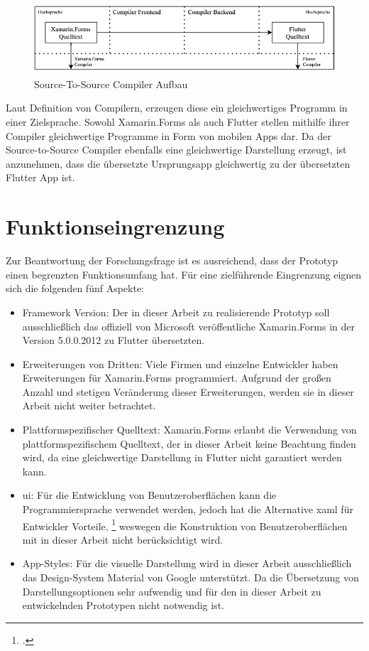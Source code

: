 \begin{figure}[!ht]
 \includegraphics[width=14.5cm]{Images/CompilerArchitecture/S2SArchitecture.png}
 \caption{Source-To-Source Compiler Aufbau}
 \label{fig:S2SCompilerAufbau}
\end{figure}

Laut Definition von Compilern, erzeugen diese ein gleichwertiges Programm in einer Zielsprache.  Sowohl Xamarin.Forms als auch Flutter stellen mithilfe ihrer Compiler gleichwertige Programme in Form von mobilen Apps dar.  Da der Source-to-Source Compiler ebenfalls eine gleichwertige Darstellung erzeugt, ist anzunehmen, dass die übersetzte Ursprungsapp gleichwertig zu der übersetzten Flutter App ist. 

\section{Funktionseingrenzung}
Zur Beantwortung der Forschungsfrage ist es ausreichend, dass der Prototyp einen begrenzten Funktionsumfang hat.  Für eine zielführende Eingrenzung eignen sich die folgenden fünf Aspekte:

\begin{itemize}
\setlength\itemsep{-0.6em}
 \item Framework Version: Der in dieser Arbeit zu realisierende Prototyp soll ausschließlich das offiziell von Microsoft veröffentliche Xamarin.Forms in der Version 5.0.0.2012 zu Flutter übersetzten.  
 \item Erweiterungen von Dritten: Viele Firmen und einzelne Entwickler haben Erweiterungen für Xamarin.Forms programmiert.  Aufgrund der großen Anzahl und stetigen Veränderung dieser Erweiterungen, werden sie in dieser Arbeit nicht weiter betrachtet.  
 \item Plattformspezifischer Quelltext: Xamarin.Forms erlaubt die Verwendung von plattformspezifischem Quelltext,  der in dieser Arbeit keine Beachtung finden wird, da eine gleichwertige Darstellung in Flutter nicht garantiert werden kann. 
  \item \ac{ui}: Für die Entwicklung von Benutzeroberflächen kann die Programmiersprache \Csharp{} verwendet werden,  jedoch hat die Alternative \ac{xaml} für Entwickler Vorteile, \footcite[Vgl.][Abgerufen am \today]{MicrosoftXAML2017} weswegen die Konstruktion von Benutzeroberflächen mit \Csharp{} in dieser Arbeit nicht berücksichtigt wird.  
  \item App-Styles: Für die visuelle Darstellung wird in dieser Arbeit ausschließlich das Design-System Material von Google unterstützt.  Da die Übersetzung von Darstellungsoptionen sehr aufwendig  und für den in dieser Arbeit zu entwickelnden Prototypen nicht notwendig ist.  
\end{itemize}

